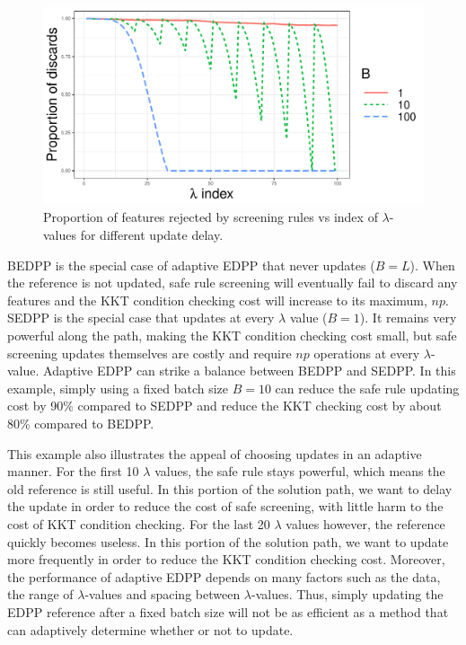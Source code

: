 \begin{figure}[ht]
    \centering
    \includegraphics[scale = 0.6]{plots/batchsizes.pdf}    \caption{Proportion of features rejected by screening rules vs index of $\lambda$-values for different update delay.}
    \label{fig:batchsizes}
\end{figure}

BEDPP is the special case of adaptive EDPP that never updates ($B=L$). When the reference is not updated, safe rule screening will eventually fail to discard any features and the KKT condition checking cost will increase to its maximum, $np$. SEDPP is the special case that updates at every $\lambda$ value ($B=1$). It remains very powerful along the path, making the KKT condition checking cost small, but safe screening updates themselves are costly and require $np$ operations at every $\lambda$-value. Adaptive EDPP can strike a balance between BEDPP and SEDPP. In this example, simply using a fixed batch size $B=10$ can reduce the safe rule updating cost by 90\% compared to SEDPP and reduce the KKT checking cost by about 80\% compared to BEDPP.

This example also illustrates the appeal of choosing updates in an adaptive manner. For the first 10 $\lambda$ values, the safe rule stays powerful, which means the old reference is still useful. In this portion of the solution path, we want to delay the update in order to reduce the cost of safe screening, with little harm to the cost of KKT condition checking. For the last 20 $\lambda$ values however, the reference quickly becomes useless. In this portion of the solution path, we want to update more frequently in order to reduce the KKT condition checking cost. Moreover, the performance of adaptive EDPP depends on many factors such as the data, the range of $\lambda$-values and spacing between $\lambda$-values. Thus, simply updating the EDPP reference after a fixed batch size will not be as efficient as a method that can adaptively determine whether or not to update.

